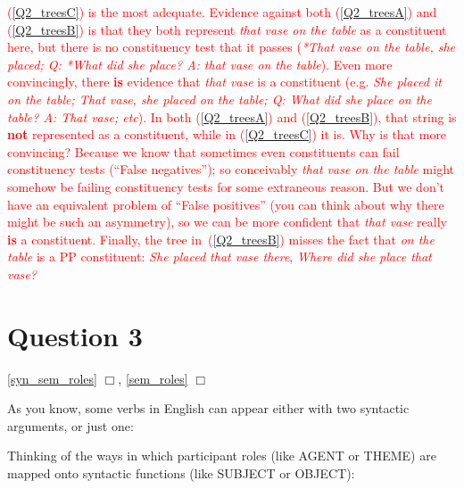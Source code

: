 \documentclass{article}
\begin{document}
\textcolor{red}{(\ref{Q2_treesC}) is the most adequate.
Evidence against both (\ref{Q2_treesA}) and (\ref{Q2_treesB}) is that they both represent \emph{that vase on the table} as a constituent here, but there is no constituency test that it passes (\emph{*That vase on the table, she placed; Q: *What did she place? A: that vase on the table}).
Even more convincingly, there \textbf{is} evidence that \emph{that vase} is a constituent (e.g. \emph{She placed it on the table; That vase, she placed on the table; Q: What did she place on the table? A: That vase; etc}).
In both (\ref{Q2_treesA}) and (\ref{Q2_treesB}), that string is \textbf{not} represented as a constituent, while in (\ref{Q2_treesC}) it is.
Why is that more convincing?
Because we know that sometimes even constituents can fail constituency tests (``False negatives''); so conceivably \emph{that vase on the table} might somehow be failing constituency tests for some extraneous reason.
But we don't have an equivalent problem of ``False positives'' (you can think about why there might be such an asymmetry), so we can be more confident that \emph{that vase} really \textbf{is} a constituent. Finally, the tree in~(\ref{Q2_treesB}) misses the fact that \emph{on the table} is a PP constituent: \emph{She placed that vase there}, \emph{Where did she place that vase?}}


\section*{Question 3}
\hfill{}
\ref{syn_sem_roles} $\Box$,
\ref{sem_roles} $\Box$

As you know, some verbs in English can appear either with two syntactic arguments, or just one:
\begin{exe}
    \label{semantic_rolesA}
    \label{semantic_rolesB}
\end{exe}
Thinking of the ways in which participant roles (like AGENT or THEME) are mapped onto syntactic functions (like SUBJECT or OBJECT):
\end{document}
